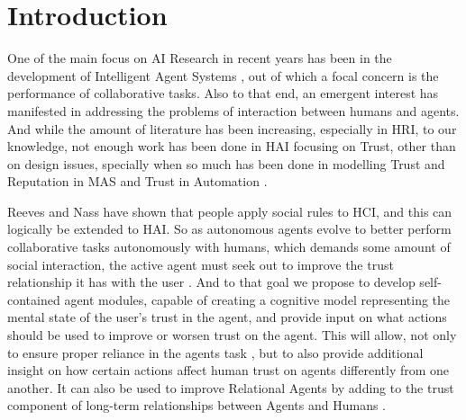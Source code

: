\section{Introduction}
\label{sec:Introduction}

One of the main focus on \ac{AI} Research in recent years has been in the development of Intelligent Agent Systems \cite{Russell2009a}, out of which a focal concern is the performance of collaborative tasks\cite{Grosz1996, Allen2002, Allen2007}. Also to that end, an emergent interest has manifested in addressing the problems of interaction between humans and agents\cite{Bradshaw2011}. And while the amount of literature has been increasing, especially in \ac{HRI}\cite{Goodrich2007, VandenBrule2014}, to our knowledge, not enough work has been done in \ac{HAI} focusing on Trust, other than on design issues\cite{Bickmore2005}, specially when so much has been done in modelling Trust and Reputation in \ac{MAS}\cite{Granatyr2015} and Trust in Automation \cite{Lee1992, Jones1997, Lee2004}.

Reeves and Nass have shown that people apply social rules to \ac{HCI}, and this can logically be extended to \ac{HAI}\cite{Reeves1998a}. So as autonomous agents evolve to better perform collaborative tasks autonomously with humans, which demands some amount of social interaction, the active agent must seek out to improve the trust relationship it has with the user \cite{Lashkari1994}. And to that goal we propose to develop self-contained agent modules, capable of creating a cognitive model representing the mental state of the user's trust in the agent, and provide input on what actions should be used to improve or worsen trust on the agent. This will allow, not only to ensure proper reliance in the agents task \cite{Lee2004}, but to also provide additional insight on how certain actions affect human trust on agents differently from one another. It can also be used to improve Relational Agents by adding to the trust component of long-term relationships between Agents and Humans \cite{Bickmore2001b}.


